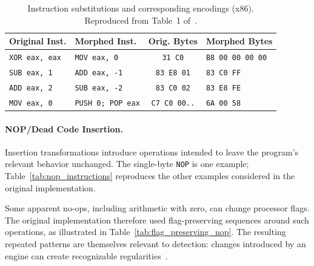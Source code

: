 \documentclass[runningheads]{llncs}
\begin{document}
\begin{table}[t]
    \caption{Instruction substitutions and corresponding encodings (x86). Reproduced from Table~1 of~\cite{zone_secrypt_2026}.}
    \label{tab:instruction_substitutions_x86}
    \small
    \centering
    \setlength{\tabcolsep}{3pt}
    \begin{tabular}{llcl}
        \hline
        \textbf{Original Inst.} & \textbf{Morphed Inst.} & \textbf{Orig. Bytes} & \textbf{Morphed Bytes} \\ \hline
        \texttt{XOR eax, eax} & \texttt{MOV eax, 0} & \texttt{31 C0} & \texttt{B8 00 00 00 00} \\
        \texttt{SUB eax, 1} & \texttt{ADD eax, -1} & \texttt{83 E8 01} & \texttt{83 C0 FF} \\
        \texttt{ADD eax, 2} & \texttt{SUB eax, -2} & \texttt{83 C0 02} & \texttt{83 E8 FE} \\
        \texttt{MOV eax, 0} & \texttt{PUSH 0; POP eax} & \texttt{C7 C0 00..} & \texttt{6A 00 58} \\ \hline
    \end{tabular}
\end{table}

\paragraph{NOP/Dead Code Insertion.}
Insertion transformations introduce operations intended to leave the program's relevant behavior unchanged. The single-byte \texttt{NOP} is one example; Table~\ref{tab:nop_instructions} reproduces the other examples considered in the original implementation.

Some apparent no-ops, including arithmetic with zero, can change processor flags. The original implementation therefore used flag-preserving sequences around such operations, as illustrated in Table~\ref{tab:flag_preserving_nop}. The resulting repeated patterns are themselves relevant to detection: changes introduced by an engine can create recognizable regularities~\cite{pushfmeth}.
\end{document}
